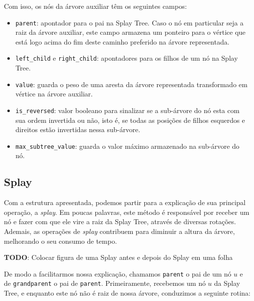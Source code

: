 Com isso, os nós da árvore auxiliar têm os seguintes campos:

\begin{itemize}
    \item \texttt{parent}: apontador para o pai na Splay Tree. Caso o nó em particular seja a raiz da árvore auxiliar, este campo armazena um ponteiro para o vértice que está logo acima do fim deste caminho preferido na árvore representada.
    \item \texttt{left\_child} e \texttt{right\_child}: apontadores para os filhos de um nó na Splay Tree.
    \item \texttt{value}: guarda o peso de uma aresta da árvore representada transformado em vértice na árvore auxiliar.
    \item \texttt{is\_reversed}: valor booleano para sinalizar se a sub-árvore do nó esta com sua ordem invertida ou não, isto é, se todas as posições de filhos esquerdos e direitos estão  invertidas nessa  sub-árvore.
    \item \texttt{max\_subtree\_value}: guarda o valor máximo armazenado na sub-árvore do nó.
\end{itemize}

\subsection{Splay}
\label{subsection:lct-splay-splay}

Com a estrutura apresentada, podemos partir para a explicação de sua principal operação, a \emph{splay}. Em poucas palavras, este método é responsável por receber um nó e fazer com que ele vire a raiz da Splay Tree, através de diversas rotações. Ademais, as operações de \emph{splay} contribuem para diminuir a altura da árvore, melhorando o seu consumo de tempo.

\begin{center}
    \textbf{TODO}: Colocar figura de uma Splay antes e depois do Splay em uma folha
\end{center}

De modo a facilitarmos nossa explicação, chamamos \texttt{parent} o pai de um nó $u$ e de \texttt{grandparent} o pai de \texttt{parent}. Primeiramente, recebemos um nó $u$ da Splay Tree, e enquanto este nó não é raiz de nossa árvore, conduzimos a seguinte rotina:


